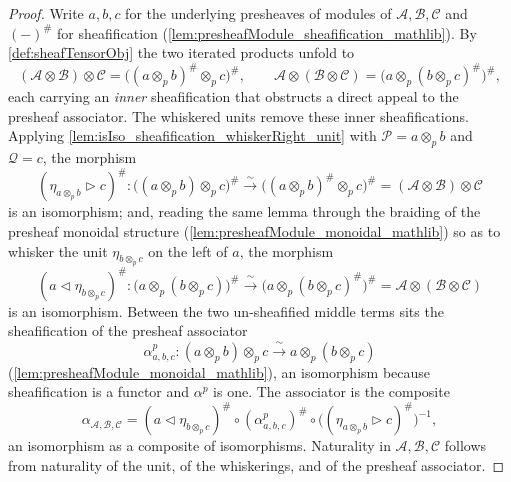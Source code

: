\begin{proof}
    \leanok
  Write \(a, b, c\) for the underlying presheaves of modules of
  \(\mathcal{A}, \mathcal{B}, \mathcal{C}\) and \((-)^{\#}\) for sheafification
  (\cref{lem:presheafModule_sheafification_mathlib}). By
  \cref{def:sheafTensorObj} the two iterated products unfold to
  \[
    (\mathcal{A} \otimes \mathcal{B}) \otimes \mathcal{C}
      = \bigl((a \otimes_p b)^{\#} \otimes_p c\bigr)^{\#},
    \qquad
    \mathcal{A} \otimes (\mathcal{B} \otimes \mathcal{C})
      = \bigl(a \otimes_p (b \otimes_p c)^{\#}\bigr)^{\#},
  \]
  each carrying an \emph{inner} sheafification that obstructs a direct appeal to
  the presheaf associator. The whiskered units remove these inner
  sheafifications. Applying \cref{lem:isIso_sheafification_whiskerRight_unit}
  with \(\mathcal{P} = a \otimes_p b\) and \(\mathcal{Q} = c\), the morphism
  \[
    (\eta_{a \otimes_p b} \rhd c)^{\#} :
    \bigl((a \otimes_p b) \otimes_p c\bigr)^{\#}
    \xrightarrow{\ \sim\ }
    \bigl((a \otimes_p b)^{\#} \otimes_p c\bigr)^{\#}
    = (\mathcal{A} \otimes \mathcal{B}) \otimes \mathcal{C}
  \]
  is an isomorphism; and, reading the same lemma through the braiding of the
  presheaf monoidal structure (\cref{lem:presheafModule_monoidal_mathlib}) so as
  to whisker the unit \(\eta_{b \otimes_p c}\) on the left of \(a\), the
  morphism
  \[
    (a \lhd \eta_{b \otimes_p c})^{\#} :
    \bigl(a \otimes_p (b \otimes_p c)\bigr)^{\#}
    \xrightarrow{\ \sim\ }
    \bigl(a \otimes_p (b \otimes_p c)^{\#}\bigr)^{\#}
    = \mathcal{A} \otimes (\mathcal{B} \otimes \mathcal{C})
  \]
  is an isomorphism. Between the two un-sheafified middle terms sits the
  sheafification of the presheaf associator
  \[
    \alpha^p_{a,b,c} :
    (a \otimes_p b) \otimes_p c
    \xrightarrow{\ \sim\ }
    a \otimes_p (b \otimes_p c)
  \]
  (\cref{lem:presheafModule_monoidal_mathlib}), an isomorphism because
  sheafification is a functor and \(\alpha^p\) is one. The associator is the
  composite
  \[
    \alpha_{\mathcal{A},\mathcal{B},\mathcal{C}}
    = (a \lhd \eta_{b \otimes_p c})^{\#}
      \circ (\alpha^p_{a,b,c})^{\#}
      \circ \bigl((\eta_{a \otimes_p b} \rhd c)^{\#}\bigr)^{-1},
  \]
  an isomorphism as a composite of isomorphisms. Naturality in
  \(\mathcal{A}, \mathcal{B}, \mathcal{C}\) follows from naturality of the unit,
  of the whiskerings, and of the presheaf associator.
\end{proof}

